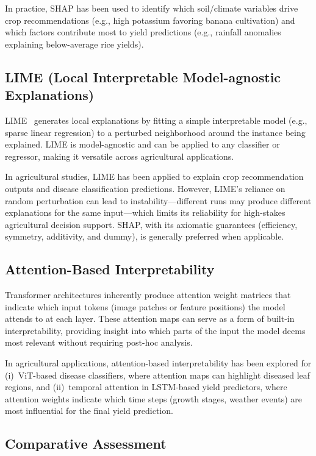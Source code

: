 \documentclass[journal]{IEEEtran}
\begin{document}
In practice, SHAP has been used to identify which soil/climate variables drive crop recommendations (e.g., high potassium favoring banana cultivation) and which factors contribute most to yield predictions (e.g., rainfall anomalies explaining below-average rice yields).

\subsection{LIME (Local Interpretable Model-agnostic Explanations)}

LIME~\cite{ribeiro2016should} generates local explanations by fitting a simple interpretable model (e.g., sparse linear regression) to a perturbed neighborhood around the instance being explained. LIME is model-agnostic and can be applied to any classifier or regressor, making it versatile across agricultural applications.

In agricultural studies, LIME has been applied to explain crop recommendation outputs and disease classification predictions. However, LIME's reliance on random perturbation can lead to instability---different runs may produce different explanations for the same input---which limits its reliability for high-stakes agricultural decision support. SHAP, with its axiomatic guarantees (efficiency, symmetry, additivity, and dummy), is generally preferred when applicable.

\subsection{Attention-Based Interpretability}

Transformer architectures inherently produce attention weight matrices that indicate which input tokens (image patches or feature positions) the model attends to at each layer. These attention maps can serve as a form of built-in interpretability, providing insight into which parts of the input the model deems most relevant without requiring post-hoc analysis.

In agricultural applications, attention-based interpretability has been explored for (i)~ViT-based disease classifiers, where attention maps can highlight diseased leaf regions, and (ii)~temporal attention in LSTM-based yield predictors, where attention weights indicate which time steps (growth stages, weather events) are most influential for the final yield prediction.

\subsection{Comparative Assessment}
\end{document}
